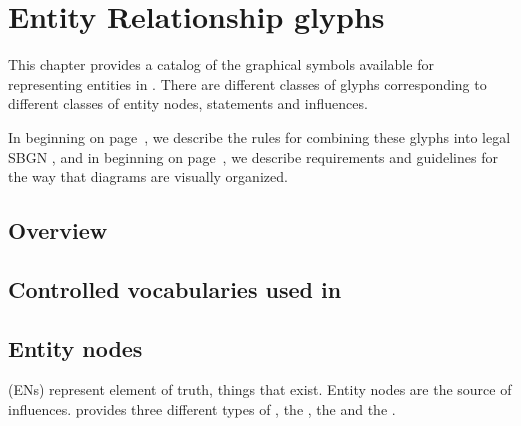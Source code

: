 
\chapter{Entity Relationship glyphs}
\label{chp:glyph}

This chapter provides a catalog of the graphical symbols available for representing entities in \ERms.  There are different classes of glyphs corresponding to different classes of entity nodes, statements and influences.

In  beginning on page~\pageref{chp:grammar}, we describe the rules for combining these glyphs into legal SBGN \ERs, and in  beginning on page~\pageref{chp:layout}, we describe requirements and guidelines for the way that diagrams are visually organized.

\section{Overview}
 

 
\section{Controlled vocabularies used in \SBGNERLone}\label{sec:CVs}


 
 
\section{Entity nodes}\label{sec:ENs}

 (ENs) represent element of truth, things that exist. 
Entity nodes are the source of influences. \SBGNERLone{} provides three different types of , the , the  and the . 

